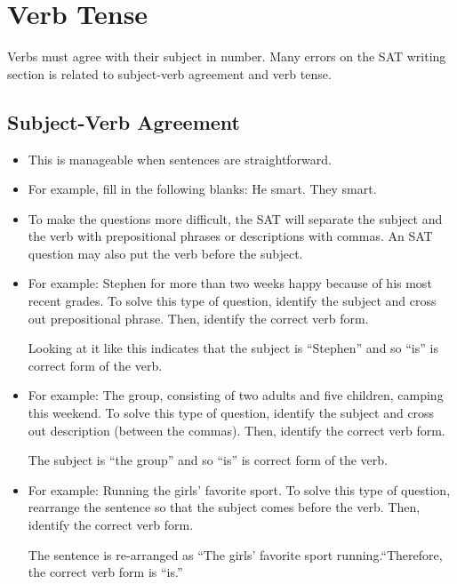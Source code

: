 \section{Verb Tense}

Verbs must agree with their subject in number. Many errors on the SAT writing section is related to subject-verb agreement and verb tense.
\subsection{Subject-Verb Agreement}

\begin{itemize}
\item{This is manageable when sentences are straightforward.}
\item{For example, fill in the following blanks: He \shortline smart. They \shortline smart.}
\item{To make the questions more difficult, the SAT will separate the subject and the verb with prepositional phrases or descriptions
with commas. An SAT question may also put
the verb before the subject.}
\item{For example: Stephen for more than two weeks \shortline happy because of his most recent grades. To solve
this type of question, identify the subject and cross out prepositional phrase. Then, identify
the correct verb form.}

\bigskip
Looking at it like this indicates that the subject is ``Stephen'' and so ``is'' is correct form of
the verb.

\item{For example: The group, consisting of two adults and five children, \shortline camping this weekend. To solve this type of question, identify the subject and cross out description (between the commas). Then, identify the correct verb form.}

\bigskip
The subject is ``the group'' and so ``is'' is correct form of the verb.

\item{For example: Running \shortline the girls' favorite sport. To solve this type of question, rearrange the sentence so that the subject comes before the verb. Then, identify the correct verb form.}

\bigskip
The sentence is re-arranged as ``The girls' favorite sport \shortline running.``Therefore, the correct verb form is ``is.''
\end{itemize}

